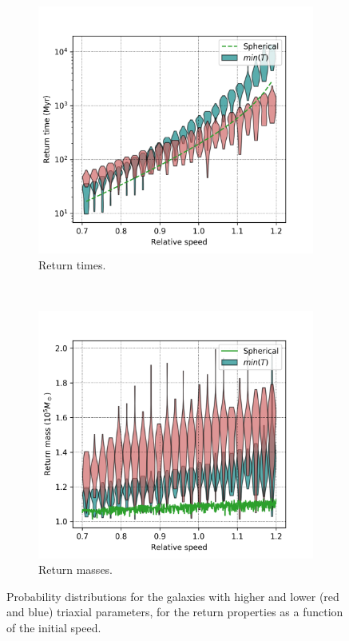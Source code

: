 	\begin{figure}[h]
		\centering
		\begin{subfigure}[t]{0.49\textwidth}
			\includegraphics[width = \linewidth]{"../Files/Week 13/rt_speed"}
			\caption{Return times.}
			\label{fig: timeSpeedDist}
		\end{subfigure}
		~ 
		\begin{subfigure}[t]{0.49\textwidth}
			\includegraphics[width = \linewidth]{"../Files/Week 13/rt_mass"}
			\caption{Return masses.}
			\label{fig: massSpeedDist}
		\end{subfigure}
		\caption{Probability distributions for the galaxies with higher and lower (red and blue) triaxial parameters, for the return properties as a function of the initial speed.}
		\label{fig: speedDist}
	\end{figure}
	
